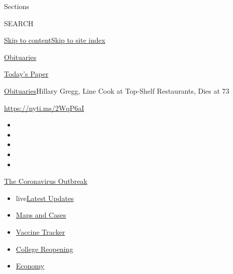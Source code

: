 Sections

SEARCH

\protect\hyperlink{site-content}{Skip to
content}\protect\hyperlink{site-index}{Skip to site index}

\href{https://www.nytimes3xbfgragh.onion/section/obituaries}{Obituaries}

\href{https://myaccount.nytimes3xbfgragh.onion/auth/login?response_type=cookie\&client_id=vi}{}

\href{https://www.nytimes3xbfgragh.onion/section/todayspaper}{Today's
Paper}

\href{/section/obituaries}{Obituaries}\textbar{}Hillary Gregg, Line Cook
at Top-Shelf Restaurants, Dies at 73

\url{https://nyti.ms/2WqP6aI}

\begin{itemize}
\item
\item
\item
\item
\item
\end{itemize}

\href{https://www.nytimes3xbfgragh.onion/news-event/coronavirus?action=click\&pgtype=Article\&state=default\&region=TOP_BANNER\&context=storylines_menu}{The
Coronavirus Outbreak}

\begin{itemize}
\tightlist
\item
  live\href{https://www.nytimes3xbfgragh.onion/2020/08/04/world/coronavirus-covid-19.html?action=click\&pgtype=Article\&state=default\&region=TOP_BANNER\&context=storylines_menu}{Latest
  Updates}
\item
  \href{https://www.nytimes3xbfgragh.onion/interactive/2020/us/coronavirus-us-cases.html?action=click\&pgtype=Article\&state=default\&region=TOP_BANNER\&context=storylines_menu}{Maps
  and Cases}
\item
  \href{https://www.nytimes3xbfgragh.onion/interactive/2020/science/coronavirus-vaccine-tracker.html?action=click\&pgtype=Article\&state=default\&region=TOP_BANNER\&context=storylines_menu}{Vaccine
  Tracker}
\item
  \href{https://www.nytimes3xbfgragh.onion/2020/08/02/us/covid-college-reopening.html?action=click\&pgtype=Article\&state=default\&region=TOP_BANNER\&context=storylines_menu}{College
  Reopening}
\item
  \href{https://www.nytimes3xbfgragh.onion/live/2020/08/03/business/stock-market-today-coronavirus?action=click\&pgtype=Article\&state=default\&region=TOP_BANNER\&context=storylines_menu}{Economy}
\end{itemize}

